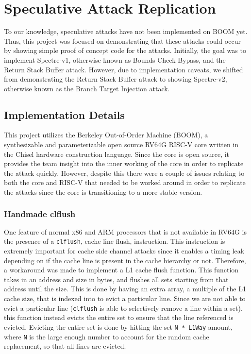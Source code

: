 \section{Speculative Attack Replication}

To our knowledge, speculative attacks have not been implemented on BOOM yet. Thus,
this project was focused on demonstrating that these attacks could occur by showing
simple proof of concept code for the attacks. Initially, the goal was to implement
Spectre-v1, otherwise known as Bounds Check Bypass, and the Return Stack Buffer attack.
However, due to implementation caveats, we shifted from demonstrating the Return Stack 
Buffer attack to showing Spectre-v2, otherwise known as the Branch Target Injection 
attack.

\subsection{Implementation Details}

This project utilizes the Berkeley Out-of-Order Machine (BOOM), a synthesizable and 
parameterizable open source RV64G RISC-V core written in the Chisel hardware construction language. 
Since the core is open source, it provides the team insight into the inner working of the core
in order to replicate the attack quickly. However, despite this there were a couple of issues 
relating to both the core and RISC-V that needed to be worked around in order to 
replicate the attacks since the core is transitioning to a more stable version.

\subsubsection{Handmade clflush}

One feature of normal x86 and ARM processors that is not available in RV64G is the presence of
a {\tt clflush}, cache line flush, instruction. This instruction is extremely important for 
cache side channel attacks since it enables a timing leak depending on if the cache line is
present in the cache hierarchy or not. Therefore, a workaround was made to implement a 
L1 cache flush function. This function takes in an address and size in bytes, and flushes
all sets starting from that address until the size. This is done by having an extra array, 
a multiple of the L1 cache size, that is indexed into to evict a particular line. Since we are
not able to evict a particular line ({\tt clflush} is able to selectively remove a line within a set),
this function instead evicts the entire set to ensure that the line referenced is evicted. Evicting
the entire set is done by hitting the set {\tt N * L1Way} amount, where {\tt N} is the large enough number to 
account for the random cache replacement, so that all lines are evicted.
